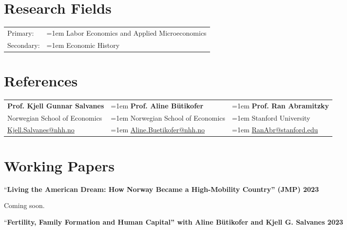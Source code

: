 \documentclass[11pt,]{article}
\begin{document}
\hypertarget{research-fields}{%
\section{Research Fields}\label{research-fields}}

\vspace{-1mm}
\begin{tabular}{p{.85in}>{\hangindent=1em}p{5.65in}<{\raggedright}}
Primary:   & Labor Economics and Applied Microeconomics\\
Secondary: & Economic History\\
\end{tabular}
\vspace{-1mm}

\hypertarget{references}{%
\section{References}\label{references}}

\begin{tabular}{p{2.15in}>{\hangindent=1em}p{2.15in}>{\hangindent=1em}p{2.15in}<{\raggedright}}
\textbf{Prof. Kjell Gunnar Salvanes}   & \textbf{Prof. Aline Bütikofer} &  \textbf{Prof. Ran Abramitzky}\\
Norwegian School of Economics & Norwegian School of Economics & Stanford University\\
\href{mailto:Kjell.Salvanes@nhh.no}{Kjell.Salvanes@nhh.no} \vspace{2mm} & \href{mailto:Aline.Buetikofer@nhh.no}{Aline.Buetikofer@nhh.no} \vspace{2mm} & \href{mailto:RanAbr@stanford.edu}{RanAbr@stanford.edu}\\
\end{tabular}

\hypertarget{working-papers}{%
\section{Working Papers}\label{working-papers}}

``\textbf{Living the American Dream: How Norway Became a High-Mobility
Country'' (JMP) \hfill 2023}

Coming soon.\vspace{0.3cm}\vspace{-0.2cm}

``\textbf{Fertility, Family Formation and Human Capital'' with Aline
Bütikofer and Kjell G. Salvanes \hfill 2023}
\end{document}
